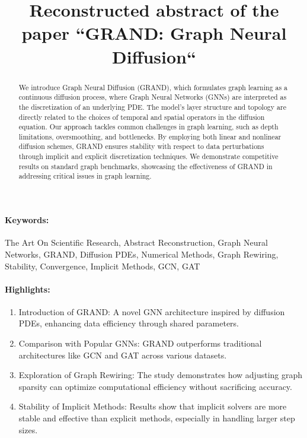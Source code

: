 \documentclass[12pt]{article}
\title{Reconstructed abstract of the paper ``GRAND: Graph Neural Diffusion``}
\date{}
\begin{document}
\maketitle

\begin{abstract}
We introduce Graph Neural Diffusion (GRAND), which formulates graph learning as a continuous diffusion process, where Graph Neural Networks (GNNs) are interpreted as the discretization of an underlying PDE. The model's layer structure and topology are directly related to the choices of temporal and spatial operators in the diffusion equation. Our approach tackles common challenges in graph learning, such as depth limitations, oversmoothing, and bottlenecks. By employing both linear and nonlinear diffusion schemes, GRAND ensures stability with respect to data perturbations through implicit and explicit discretization techniques. We demonstrate competitive results on standard graph benchmarks, showcasing the effectiveness of GRAND in addressing critical issues in graph learning.
\end{abstract}
\paragraph{Keywords:} The Art On Scientific Research, Abstract Reconstruction, Graph Neural Networks, GRAND, Diffusion PDEs, Numerical Methods, Graph Rewiring, Stability, Convergence, Implicit Methods, GCN, GAT

\paragraph{Highlights:}
\begin{enumerate}
\item Introduction of GRAND: A novel GNN architecture inspired by diffusion PDEs, enhancing data efficiency through shared parameters.
\item Comparison with Popular GNNs: GRAND outperforms traditional architectures like GCN and GAT across various datasets.
\item Exploration of Graph Rewiring: The study demonstrates how adjusting graph sparsity can optimize computational efficiency without sacrificing accuracy.
\item Stability of Implicit Methods: Results show that implicit solvers are more stable and effective than explicit methods, especially in handling larger step sizes.
\end{enumerate}
\end{document}
